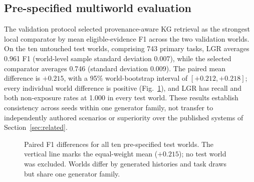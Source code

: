 \documentclass[conference]{IEEEtran}
\newcommand{\lgr}{\textsc{LGR}\xspace}
\begin{document}
\subsection{Pre-specified multiworld evaluation}
The validation protocol selected provenance-aware KG retrieval as the strongest local comparator by mean eligible-evidence F1 across the two validation worlds. On the ten untouched test worlds, comprising 743 primary tasks, \lgr{} averages 0.961 F1 (world-level sample standard deviation 0.007), while the selected comparator averages 0.746 (standard deviation 0.009). The paired mean difference is $+0.215$, with a 95\% world-bootstrap interval of $[+0.212,+0.218]$; every individual world difference is positive (Fig.~\ref{fig:multiworld}), and \lgr{} has recall and both non-exposure rates at 1.000 in every test world. These results establish consistency across seeds within one generator family, not transfer to independently authored scenarios or superiority over the published systems of Section~\ref{sec:related}.

\begin{figure}[t]
\centering
{}
\caption{Paired F1 differences for all ten pre-specified test worlds. The vertical line marks the equal-weight mean ($+0.215$); no test world was excluded. Worlds differ by generated histories and task draws but share one generator family.}
\label{fig:multiworld}
\end{figure}
\end{document}
